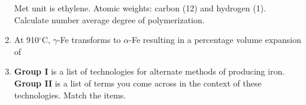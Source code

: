 \documentclass[journal,12pt,onecolumn]{IEEEtran}
\theoremstyle{remark}
\begin{document}
\begin{enumerate}
    Met unit is ethylene. Atomic weights: carbon (12) and hydrogen (1). Calculate number average degree of polymerization.
    \hfill{}
    \begin{enumerate}[label=(\Alph*)]
    \end{enumerate}

    \item At 910$^\circ$C, $\gamma$-Fe transforms to $\alpha$-Fe resulting in a percentage volume expansion of
    \hfill{}
    \begin{enumerate}[label=(\Alph*)]
    \end{enumerate}

    \item \textbf{Group I} is a list of technologies for alternate methods of producing iron. \textbf{Group II} is a list of terms you come across in the context of these technologies. Match the items.


\end{enumerate}
\end{document}
